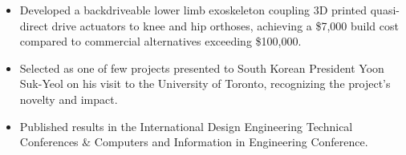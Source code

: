 \documentclass[letterpaper,11pt]{article}
\makeatletter
\newcommand{\resumeItem}[1]{
  \item\small{
    {#1 \vspace{-2.5pt}}
  }
}
\newcommand{\resumeSubheading}[4]{
  \vspace{-2pt}\item
    \begin{tabular*}{0.97\textwidth}[t]{l@{\extracolsep{\fill}}r}
      \textbf{#1} & #2 \\
      \textit{\small#3} & \textit{\small #4} \\
    \end{tabular*}\vspace{-7pt}
}
\newcommand{\resumeSubSubheading}[2]{
    \item
    \begin{tabular*}{0.97\textwidth}{l@{\extracolsep{\fill}}r}
      \textit{\small#1} & \textit{\small #2} \\
    \end{tabular*}\vspace{-7pt}
}
\newcommand{\resumeSubHeadingListEnd}{\end{itemize}}
\newcommand{\resumeItemListStart}{\begin{itemize}}
\newcommand{\resumeItemListEnd}{\end{itemize}\vspace{-5pt}}
\newcommand\z{-2.4pt}
\makeatother
\begin{document}

\resumeItemListStart
    \resumeItem{Developed a backdriveable lower limb exoskeleton coupling 3D printed quasi-direct drive actuators to knee and hip orthoses, achieving a \$7,000 build cost compared to commercial alternatives exceeding \$100,000.}
    \resumeItem{Selected as one of few projects presented to South Korean President Yoon Suk-Yeol on his visit to the University of Toronto, recognizing the project's novelty and impact.}
	\resumeItem{Published results in the International Design Engineering Technical Conferences \& Computers and Information in Engineering Conference.}
\resumeItemListEnd
\vspace{\z}



\end{document}
